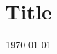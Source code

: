 \documentclass[final, xcolor=dvipsnames, table]{beamer}
\title[shortitle]{Title}
\author[shortauthor]{}
\institute[ETH Z\"urich]{ETH Z\"urich}
\date{\today}
\begin{document}
\begin{frame}
\begin{columns}[t]
	\begin{column}{.475\linewidth}
		\vspace*{-.05\textheight}
	\end{column}
	\begin{column}{.475\linewidth}
		\vspace*{-.05\textheight}
	\end{column}
\end{columns}
\end{frame}
\end{document}
